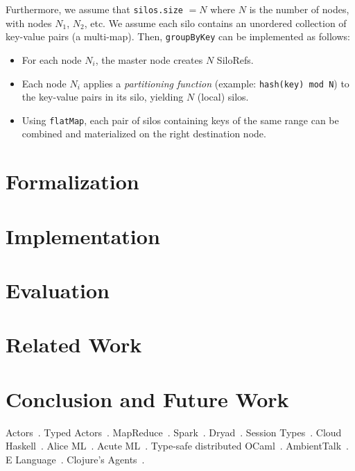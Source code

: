 \documentclass[preprint]{sigplanconf}
\theoremstyle{definition}
\theoremstyle{definition}
\begin{document}
Furthermore, we assume that \verb|silos.size| $= N$ where $N$ is the number of
nodes, with nodes $N_1$, $N_2$, etc. We assume each silo contains an unordered
collection of key-value pairs (a multi-map). Then, \verb|groupByKey| can be
implemented as follows:

\begin{itemize}
\item For each node $N_i$, the master node creates $N$ SiloRefs.

\item Each node $N_i$ applies a {\em partitioning function}
(example: \texttt{hash(key) mod N}) to the key-value pairs in its silo,
yielding $N$ (local) silos.

\item Using \verb|flatMap|, each pair of silos containing keys of the
same range can be combined and materialized on the right destination node.
\end{itemize}

\section{Formalization}
\label{sec:formalization}

\section{Implementation}
\label{sec:implementation}

\section{Evaluation}
\label{sec:evaluation}

\section{Related Work}
\label{sec:related-work}

\section{Conclusion and Future Work}
\label{sec:conclusion-future-work}

Actors~\cite{Actors, ScalaActors}. Typed Actors~\cite{TypedActors}. MapReduce~\cite{MapReduce}. Spark~\cite{Spark}. Dryad~\cite{Dryad}. Session Types~\cite{SessionTypes}. Cloud Haskell~\cite{CloudHaskell}. Alice ML~\cite{AliceML}. Acute ML~\cite{AcuteML}. Type-safe distributed OCaml~\cite{DistOCaml}. AmbientTalk~\cite{AmbientTalk}. E Language~\cite{ELang}. Clojure's Agents~\cite{Clojure}.
\end{document}
